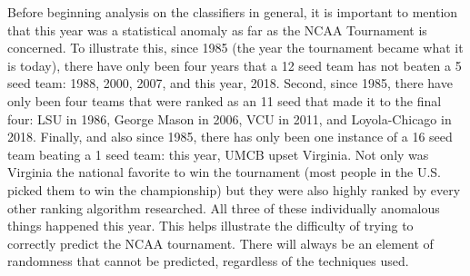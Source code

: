Before beginning analysis on the classifiers in general, it is important to mention that this year was a statistical anomaly as far as the NCAA Tournament is concerned.  
To illustrate this, since 1985 (the year the tournament became what it is today), there have only been four years that a 12 seed team has not beaten a 5 seed team: 1988, 2000, 2007, and this year, 2018.  
Second, since 1985, there have only been four teams that were ranked as an 11 seed that made it to the final four: LSU in 1986, George Mason in 2006, VCU in 2011, and Loyola-Chicago in 2018.  
Finally, and also since 1985, there has only been one instance of a 16 seed team beating a 1 seed team: this year, UMCB upset Virginia.  
Not only was Virginia the national favorite to win the tournament (most people in the U.S. picked them to win the championship) but they were also highly ranked by every other ranking algorithm researched.  
All three of these individually anomalous things happened this year.  
This helps illustrate the difficulty of trying to correctly predict the NCAA tournament.  
There will always be an element of randomness that cannot be predicted, regardless of the techniques used.  

